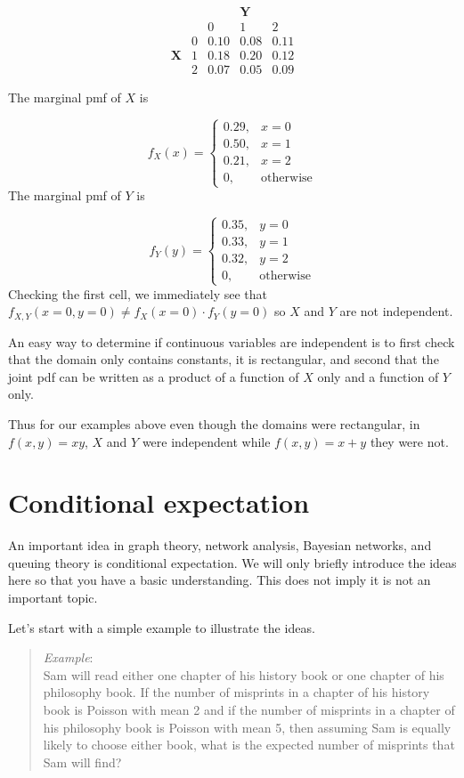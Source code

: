 \documentclass[
  letterpaper,
  DIV=11,
  numbers=noendperiod]{scrreprt}
\begin{document}
\[
\begin{array}{cc|ccc} & & & \textbf{Y} &
\\ & & 0 & 1 & 2  
\\&\hline0 & 0.10 & 0.08 & 0.11  
\\\textbf{X} &1 & 0.18 & 0.20 & 0.12  
\\&2 & 0.07 & 0.05 & 0.09 
\end{array} 
\]

The marginal pmf of \(X\) is

\[
f_X(x) = \left\{\begin{array}{ll} 0.29, & x=0 \\
0.50, & x=1 \\
0.21, & x=2 \\
0, & \mbox{otherwise} 
\end{array}\right.
\] The marginal pmf of \(Y\) is

\[
f_Y(y) = \left\{\begin{array}{ll} 0.35, & y=0 \\
0.33, & y=1 \\
0.32, & y=2 \\
0, & \mbox{otherwise} 
\end{array}\right.
\] Checking the first cell, we immediately see that
\(f_{X,Y}(x=0,y=0) \neq f_{X}(x=0)\cdot f_{Y}(y=0)\) so \(X\) and \(Y\)
are not independent.

An easy way to determine if continuous variables are independent is to
first check that the domain only contains constants, it is rectangular,
and second that the joint pdf can be written as a product of a function
of \(X\) only and a function of \(Y\) only.

Thus for our examples above even though the domains were rectangular, in
\(f(x,y)=xy\), \(X\) and \(Y\) were independent while \(f(x,y)=x+y\)
they were not.

\section{Conditional expectation}\label{conditional-expectation}

An important idea in graph theory, network analysis, Bayesian networks,
and queuing theory is conditional expectation. We will only briefly
introduce the ideas here so that you have a basic understanding. This
does not imply it is not an important topic.

Let's start with a simple example to illustrate the ideas.

\begin{quote}
\emph{Example}:\\
Sam will read either one chapter of his history book or one chapter of
his philosophy book. If the number of misprints in a chapter of his
history book is Poisson with mean 2 and if the number of misprints in a
chapter of his philosophy book is Poisson with mean 5, then assuming Sam
is equally likely to choose either book, what is the expected number of
misprints that Sam will find?
\end{quote}
\end{document}
